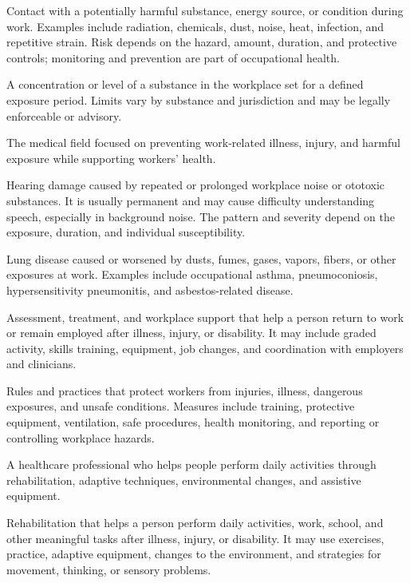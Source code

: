  Contact with a potentially harmful substance, energy source, or condition during work. Examples include radiation, chemicals, dust, noise, heat, infection, and repetitive strain. Risk depends on the hazard, amount, duration, and protective controls; monitoring and prevention are part of occupational health.

 A concentration or level of a substance in the workplace set for a defined exposure period. Limits vary by substance and jurisdiction and may be legally enforceable or advisory.

 The medical field focused on preventing work-related illness, injury, and harmful exposure while supporting workers' health.

 Hearing damage caused by repeated or prolonged
workplace noise or ototoxic substances. It is usually permanent and may cause
difficulty understanding speech, especially in background noise. The pattern and
severity depend on the exposure, duration, and individual susceptibility.

 Lung disease caused or worsened by dusts, fumes, gases, vapors, fibers, or other exposures at work. Examples include occupational asthma, pneumoconiosis, hypersensitivity pneumonitis, and asbestos-related disease.

 Assessment, treatment, and workplace support that help a person return to work or remain employed after illness, injury, or disability. It may include graded activity, skills training, equipment, job changes, and coordination with employers and clinicians.

 Rules and practices that protect workers from injuries, illness, dangerous exposures, and unsafe conditions. Measures include training, protective equipment, ventilation, safe procedures, health monitoring, and reporting or controlling workplace hazards.

 A healthcare professional who helps people perform daily activities through rehabilitation, adaptive techniques, environmental changes, and assistive equipment.

 Rehabilitation that helps a person perform daily activities, work, school, and other meaningful tasks after illness, injury, or disability. It may use exercises, practice, adaptive equipment, changes to the environment, and strategies for movement, thinking, or sensory problems.

